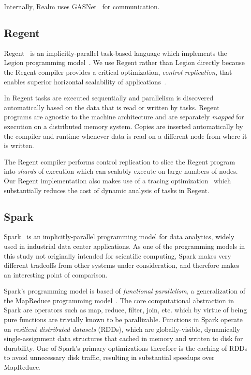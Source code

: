 Internally, Realm uses GASNet~\cite{GASNET07} for communication.

\subsection{Regent}

Regent~\cite{Regent15} is an implicitly-parallel task-based language
which implements the Legion programming model~\cite{Legion12}. We use
Regent rather than Legion directly because the Regent compiler
provides a critical optimization, \emph{control replication}, that
enables superior horizontal scalability of
applications~\cite{ControlReplication17}.

In Regent tasks are executed sequentially and parallelism is
discovered automatically based on the data that is read or written by
tasks. Regent programs are agnostic to the machine architecture and
are separately \emph{mapped} for execution on a distributed memory
system. Copies are inserted automatically by the compiler and runtime
whenever data is read on a different node from where it is written.

The Regent compiler performs control replication to slice the Regent
program into \emph{shards} of execution which can scalably execute on
large numbers of nodes. Our Regent implementation also makes use of a
tracing optimization~\cite{LegionTracing18} which substantially
reduces the cost of dynamic analysis of tasks in Regent.

\subsection{Spark}

Spark~\cite{Spark10} is an implicitly-parallel programming model for
data analytics, widely used in industrial data center applications. As
one of the programming models in this study not originally intended
for scientific computing, Spark makes very different tradeoffs from
other systems under consideration, and therefore makes an interesting
point of comparison.

Spark's programming model is based of \emph{functional parallelism}, a
generalization of the MapReduce programming
model~\cite{MapReduce04}. The core computational abstraction in Spark
are operators such as map, reduce, filter, join, etc. which by virtue
of being pure functions are trivially known to be
parallizable. Functions in Spark operate on \emph{resilient
  distributed datasets} (RDDs), which are globally-visible,
dynamically single-assignment data structures that cached in memory
and written to disk for durability. One of Spark's primary
optimizations therefore is the caching of RDDs to avoid unnecessary
disk traffic, resulting in substantial speedups over MapReduce.

